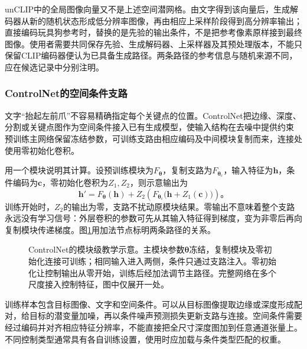 unCLIP中的全局图像向量又不是上述空间潜网格。由文字得到该向量后，生成解码器从新的随机状态形成低分辨率图像，再由相应上采样阶段得到高分辨率输出；直接编码玩具狗参考时，替换的是先验的输出条件，不是把参考像素原样接到最终图像。使用者需要共同保存先验、生成解码器、上采样器及其预处理版本，不能只保留CLIP编码器便认为已具备生成路径。两条路径的参考信息与随机来源不同，应在候选记录中分别注明。

\subsubsection{ControlNet的空间条件支路}
\label{sec:vision-generation-controlnet}

文字“抬起左前爪”不容易精确指定每个关键点的位置。ControlNet把边缘、深度、分割或关键点图作为空间条件接入已有生成模型，使输入结构在去噪中提供约束
预训练主网络保留冻结参数，可训练支路由相应编码及中间模块复制而来，连接处使用零初始化卷积。

用一个模块说明其计算。设预训练模块为$F_{\bm{\theta}}$，复制支路为$F_{\bm{\theta}_{\mathrm{c}}}$，输入特征为$\bm{h}$，条件编码为$\bm{c}$，零初始化卷积为$Z_1,Z_2$，则示意输出为
\begin{equation}
 \bm{h}'=F_{\bm{\theta}}(\bm{h})+
 Z_2\!\left(F_{\bm{\theta}_{\mathrm{c}}}
       \bigl(\bm{h}+Z_1(\bm{c})\bigr)\right)\text{。}
 \label{eq:vision-controlnet}
\end{equation}
训练开始时，$Z_2$的输出为零，支路不扰动原模块结果。零输出不意味着整个支路永远没有学习信号：外层卷积的参数可先从其输入特征得到梯度，变为非零后再向复制模块传递梯度。图\ref{fig:vision-controlnet}用加法节点标明两条路径的关系。

\begin{figure}[htbp]
 \centering
 
 \caption{ControlNet的模块级教学示意。主模块参数$\bm{\theta}$冻结，复制模块及零初始化连接可训练；相同输入进入两侧，条件只通过支路注入。零初始化让控制输出从零开始，训练后经加法调节主路径。完整网络在多个尺度接入控制特征，图中仅展开一处。}
 \label{fig:vision-controlnet}
\end{figure}

训练样本包含目标图像、文字和空间条件。可以从目标图像提取边缘或深度形成配对，给目标的潜变量加噪，再以条件噪声预测损失更新支路与连接。空间条件需要经过编码并对齐相应特征分辨率，不能直接把全尺寸深度图加到任意通道张量上。不同控制类型通常具有各自训练设置，使用时应加载与条件类型匹配的权重。

